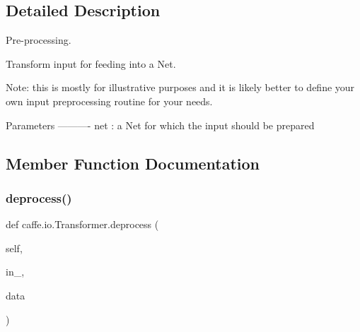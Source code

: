 \subsection{Detailed Description}
Pre-\/processing. 

\begin{DoxyVerb}Transform input for feeding into a Net.

Note: this is mostly for illustrative purposes and it is likely better
to define your own input preprocessing routine for your needs.

Parameters
----------
net : a Net for which the input should be prepared
\end{DoxyVerb}
 

\subsection{Member Function Documentation}
\mbox{\label{classcaffe_1_1io_1_1_transformer_a3d048b7f8d255d29c04c2bcce0db318e}} 
\subsubsection{\texorpdfstring{deprocess()}{deprocess()}\hspace{0.1cm}{\footnotesize\ttfamily [1/2]}}
{\footnotesize\ttfamily def caffe.\+io.\+Transformer.\+deprocess (\begin{DoxyParamCaption}\item[{}]{self,  }\item[{}]{in\+\_\+,  }\item[{}]{data }\end{DoxyParamCaption})}

